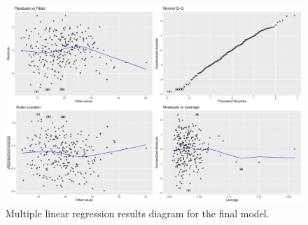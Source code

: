 \documentclass[11pt,american,american]{article}
\begin{document}
\begin{figure}[H]
	\centering
	\includegraphics[width=0.95\linewidth]{Images/FIGURES/multivar_linear_regression_final}
	\caption{Multiple linear regression results diagram for the final model.}
	\label{fig:multivar_linear_regression_final}
\end{figure}

\newpage

%
%
%
%
\end{document}

